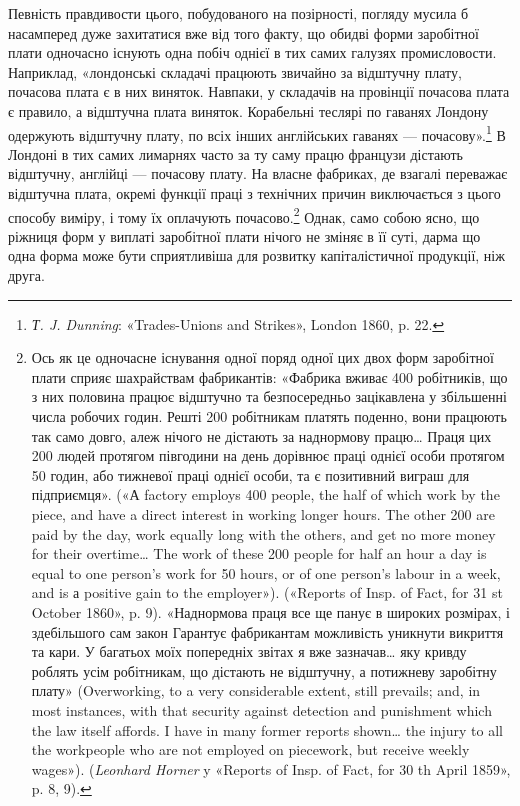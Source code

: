Певність правдивости цього, побудованого на позірності, погляду
мусила б насамперед дуже захитатися вже від того факту,
що обидві форми заробітної плати одночасно існують одна побіч
однієї в тих самих галузях промисловости. Наприклад, «лондонські
складачі працюють звичайно за відштучну плату, почасова
плата є в них виняток. Навпаки, у складачів на провінції
почасова плата є правило, а відштучна плата виняток. Корабельні
теслярі по гаванях Лондону одержують відштучну плату, по
всіх інших англійських гаванях — почасову».\footnote{
\emph{Т. J. Dunning}: «Trades-Unions and Strikes», London 1860,
p. 22.
} В Лондоні в
тих самих лимарнях часто за ту саму працю французи дістають
відштучну, англійці — почасову плату. На власне фабриках,
де взагалі переважає відштучна плата, окремі функції праці з
технічних причин виключається з цього способу виміру, і тому
їх оплачують почасово.\footnote{
Ось як це одночасне існування одної поряд одної цих двох форм
заробітної плати сприяє шахрайствам фабрикантів: «Фабрика вживає
400 робітників, що з них половина працює відштучно та безпосередньо
зацікавлена у збільшенні числа робочих годин. Решті 200 робітникам
платять поденно, вони працюють так само довго, алеж нічого не дістають
за наднормову працю\dots{} Праця цих 200 людей протягом півгодини
на день дорівнює праці однієї особи протягом 50 годин, або  тижневої
праці однієї особи, та є позитивний виграш для підприємця». («А factory
employs 400 people, the half of which work by the piece, and have a direct
interest in working longer hours. The other 200 are paid by the day,
work equally long with the others, and get no more money for their overtime\dots{}
The work of these 200 people for half an hour a day is equal to one
person’s work for 50 hours, or  of one person’s labour in a week, and is
а positive gain to the employer»). («Reports of Insp. of Fact, for 31 st
October 1860», p. 9). «Наднормова праця все ще панує в широких розмірах,
і здебільшого сам закон Гарантує фабрикантам можливість уникнути
викриття та кари. У багатьох моїх попередніх звітах я вже зазначав\dots{}
яку кривду роблять усім робітникам, що дістають не відштучну, а потижневу
заробітну плату» (Overworking, to a very considerable extent,
still prevails; and, in most instances, with that security against detection
and punishment which the law itself affords. I have in many former reports
shown\dots{} the injury to all the workpeople who are not employed on piecework,
but receive weekly wages»). (\emph{Leonhard Horner} y «Reports of Insp.
of Fact, for 30 th April 1859», p. 8, 9).
} Однак, само собою ясно, що ріжниця
форм у виплаті заробітної плати нічого не зміняє в її суті, дарма
що одна форма може бути сприятливіша для розвитку капіталістичної
продукції, ніж друга.

